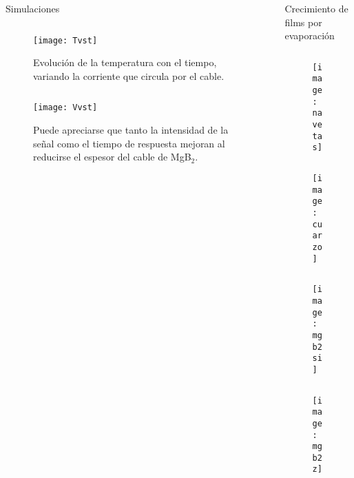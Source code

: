 \documentclass[final]{beamer}
\newlength{\sepwid}
\newlength{\onecolwid}
\begin{document}
\begin{frame}[t]
\begin{columns}[t]
\begin{column}{\onecolwid}
\begin{alertblock}{\normalsize{Simulaciones}}
\begin{column}{18cm}
\begin{figure}
\texttt{[image: Tvst]}
\caption{Evolución de la temperatura con el tiempo, variando la corriente que circula por el cable.}
\end{figure}
\end{column}
\begin{column}{18.8cm}
\begin{figure}
\texttt{[image: Vvst]}
\caption{Puede apreciarse que tanto la intensidad de la señal como el tiempo de respuesta mejoran al reducirse el espesor del cable de MgB$_2$.}
\end{figure}
\end{column}
\end{alertblock}
\end{column}
\hspace*{-4cm}
\begin{column}{\onecolwid}
\begin{block}{\normalsize{Crecimiento de films por evaporación}}
\begin{column}{20cm}
\vspace{-1.8cm}
\begin{figure}
 \hspace{5cm} 
 \texttt{[image: navetas]}
\end{figure}
\end{column}
\begin{column}{20cm}
\begin{figure}
 \hspace{-2cm} 
 \texttt{[image: cuarzo]}
\end{figure}
\end{column}
\begin{column}{19.5cm}
\vspace{2cm}
\begin{figure}
 \hspace{-1cm}
 \texttt{[image: mgb2si]}
\end{figure}
\end{column}
\begin{column}{19.5cm}
\vspace{2cm}
\begin{figure}
\hspace{-0.7cm}
 \texttt{[image: mgb2z]}
\end{figure}

\end{column}
\end{block}
\end{column}
\end{columns}
\end{frame}
\end{document}
